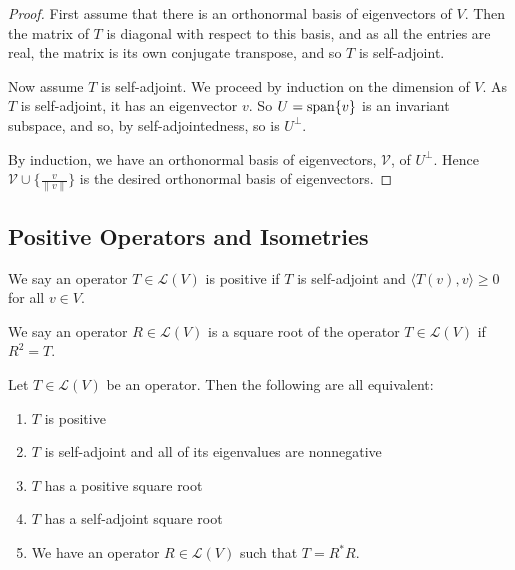 \documentclass[]{article}
\begin{document}
\begin{proof}
		First assume that there is an orthonormal basis of eigenvectors of $V$. Then the matrix of $T$ is diagonal with respect to this basis, and as all the entries are real, the matrix is its own conjugate transpose, and so $T$ is self-adjoint.

		Now assume $T$ is self-adjoint. We proceed by induction on the dimension of $V$. As $T$ is self-adjoint, it has an eigenvector $v$. So $U = \operatorname{span}\{v\}$ is an invariant subspace, and so, by self-adjointedness, so is $U^{\perp}$. 

		By induction, we have an orthonormal basis of eigenvectors, $\mathcal{V}$, of $U^{\perp}$. Hence $\mathcal{V} \cup \{\frac{v}{\|v\|}\}$ is the desired orthonormal basis of eigenvectors.
\end{proof}

\subsection{Positive Operators and Isometries}

\begin{defi} 
		We say an operator $T \in \mathcal{L}(V)$ is positive if $T$ is self-adjoint and $\langle T(v), v \rangle \geq 0$ for all $v \in V$.
\end{defi}

\begin{defi} 
		We say an operator $R \in \mathcal{L}(V)$ is a square root of the operator $T \in \mathcal{L}(V)$ if $R^2 = T$.
\end{defi}

\begin{thm} 
		Let $T \in \mathcal{L}(V)$ be an operator. Then the following are all equivalent:
		\begin{enumerate}
				\item $T$ is positive
				\item $T$ is self-adjoint and all of its eigenvalues are nonnegative
				\item $T$ has a positive square root
				\item $T$ has a self-adjoint square root
				\item We have an operator $R \in \mathcal{L}(V)$ such that $T = R^*R$.
		\end{enumerate}
\end{thm}
\end{document}
